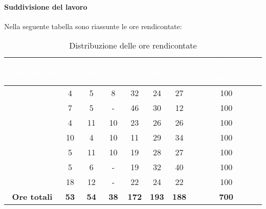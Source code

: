 \paragraph{Suddivisione del lavoro}
Nella seguente tabella sono riassunte le ore rendicontate:
\begin{table}[H]
	\begin{center}
		\begin{tabular}{ |c c c c c c c c| }
		\rowcolor{darkblue} 
		\textcolor{white}{\textbf{Nominativo}} & \textcolor{white}{\textbf{Re}} & \textcolor{white}{\textbf{Am}} & \textcolor{white}{\textbf{An}} & \textcolor{white}{\textbf{Pt}} & \textcolor{white}{\textbf{Pr}} & \textcolor{white}{\textbf{Ve}} & \textcolor{white}{\textbf{Ore Complessive}} \\ \hline
		\BL 	& 4  	& 5  	& 8 	& 32 	& 24 	& 27 	& 100 \\ \hline
		\FF 	& 7 	& 5 	& -	& 46 	& 30 	& 12 	& 100 \\ \hline
		\MM 	& 4  	& 11  	& 10 	& 23 	& 26 	& 26  	& 100 \\ \hline
		\PC 	& 10 	& 4  	& 10	& 11 	& 29	& 34 	& 100 \\ \hline
		\TG 	& 5  	& 11 	& 10 	& 19 	& 28 	& 27 	& 100 \\ \hline
		\TL 	& 5  	& 6 	& - 	& 19 	& 32 	& 40 	& 100 \\ \hline
		\VD 	& 18  	& 12  	& -	& 22 	& 24 	& 22 	& 100 \\ \hline
		\textbf{Ore totali} & \textbf{53} & \textbf{54} & \textbf{38} & \textbf{172} & \textbf{193} & \textbf{188} & \textbf{700} \\ \hline
		\end{tabular}
	\caption{Distribuzione delle ore rendicontate}
	\end{center}
\end{table}
